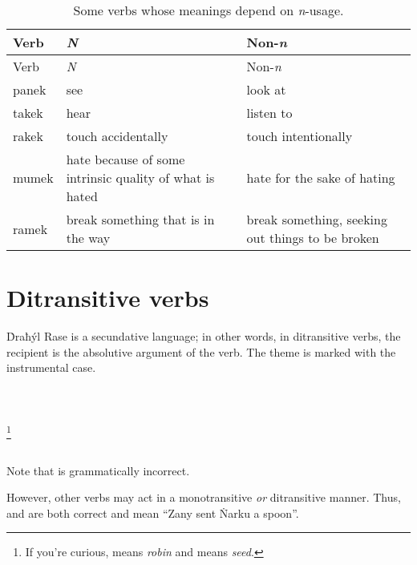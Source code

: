 \documentclass{book}
\begin{document}
\begin{longtabu}[c]{|l|X|X|}
    \caption{Some verbs whose meanings depend on \emph{n}-usage.} \\
    
    \hline
    Verb & \emph{N} & Non-\emph{n} \\
    \hline
    \endfirsthead
    
    \hline
    Verb & \emph{N} & Non-\emph{n} \\
    \hline
    \endhead
    
    \hline
    \endfoot
    
    \hline
    \endlastfoot
    
    panek & see & look at \\
    takek & hear & listen to \\
    rakek & touch accidentally & touch intentionally \\
    mumek & hate because of some intrinsic quality of what is hated & hate for the sake of hating \\
    ramek & break something that is in the way & break something, seeking out things to be broken \\
\end{longtabu}

\section{Ditransitive verbs}

Ḋraħýl Rase is a secundative language; in other words, in ditransitive verbs, the recipient is the absolutive argument of the verb. The theme is marked with the instrumental case. \\
~\\
    \\
    \\
\emph{   }\footnote{If you're curious,  means \emph{robin} and  means \emph{seed}.} \\
~

Note that  is grammatically incorrect.

However, other verbs may act in a monotransitive \emph{or} ditransitive manner. Thus,  and  are both correct and mean ``Zany sent Ṅarku a spoon''.
\end{document}
